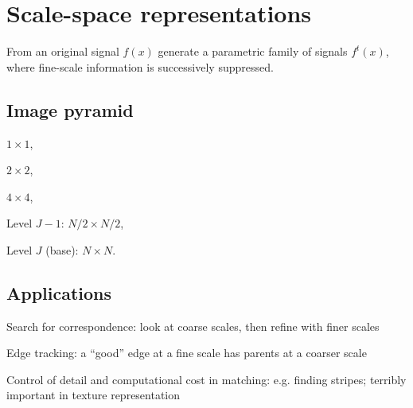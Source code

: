 \chapter{Scale-space representations}
From an original signal $f(x)$ generate a parametric family of signals $f^t(x)$, where fine-scale information is successively suppressed.
\section{Image pyramid}
\begin{inparaenum}
	\setcounter{enumi}{-1}
	\item $1\times1$,
	\item $2\times2$,
	\item $4\times 4$,
	\item[Level $J-1$:] $N/2\times N/2$,
	\item[Level $J$ (base):] $N\times N$.
\end{inparaenum}
\section{Applications}
\begin{inparaenum}[\itshape(1)]
	\item Search for correspondence: look at coarse scales, then refine with finer scales
	\item Edge tracking: a ``good'' edge at a fine scale has parents at a coarser scale
	\item Control of detail and computational cost in matching: e.g. finding stripes; terribly important in texture representation
\end{inparaenum}
